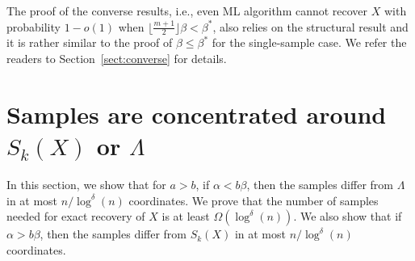 \documentclass{article}
\begin{document}
The proof of the converse results, i.e., even ML algorithm cannot recover $X$ with probability $1-o(1)$ when $\lfloor \frac{m+1}{2} \rfloor \beta < \beta^\ast$, also relies on the structural result and it is rather similar to the proof of $\beta\le\beta^\ast$ for the single-sample case. We refer the readers to Section~\ref{sect:converse} for details.

\section{Samples are concentrated around $S_k(X)$ or $\Lambda$} \label{sect:aln}
In this section, we show that for $a>b$, if $\alpha<b\beta$, then the samples differ from  $\Lambda$ in at most $n/\log^{\delta}(n)$ coordinates.
We prove that the number of samples needed for exact recovery of $X$ is at least $\Omega(\log^{\delta}(n))$. We also show that if $\alpha > b\beta$, then the samples differ from  $S_k(X)$ in at most $n/\log^{\delta}(n)$ coordinates.
\end{document}
